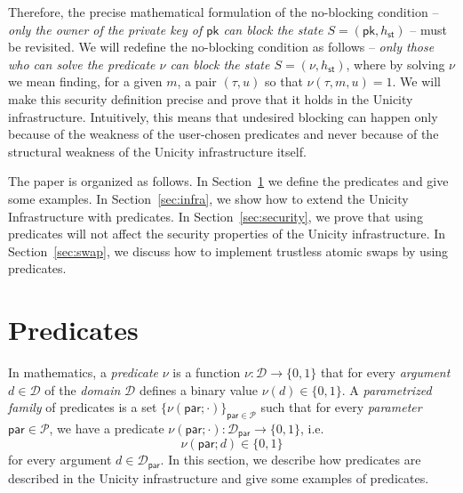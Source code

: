 \documentclass{article}
\newcommand{\pubkey}[0]{\mathsf{pk}}
\newcommand{\param}[0]{\mathsf{par}}
\newcommand{\sthash}[0]{h_\mathsf{st}}
\newcommand{\predi}[0]{\nu}
\newcommand{\systime}[0]{\tau}
\begin{document}
Therefore, the precise mathematical formulation of the no-blocking condition -- \emph{only the owner of the private key of $\pubkey$ can block the state $S=(\pubkey,\sthash)$} -- must be revisited. We will redefine the no-blocking condition as follows -- \emph{only those who can solve the predicate $\predi$ can block the state $S=(\predi,\sthash)$}, where by solving $\predi$ we mean finding, for a given $m$, a pair $(\systime,u)$ so that $\predi(\systime,m,u)=1$.
We will make this security definition precise and prove that it holds in the Unicity infrastructure. Intuitively, this means that undesired blocking can happen only because of the weakness of the user-chosen predicates and never because of the structural weakness of the Unicity infrastructure itself.

The paper is organized as follows. In Section~\ref{sec:predicates} we define the predicates and give some examples. In Section~\ref{sec:infra},
we show how to extend the Unicity Infrastructure with predicates.
In Section~\ref{sec:security}, we prove that using predicates will not affect the security properties of the Unicity infrastructure. In Section~\ref{sec:swap}, we discuss how to implement trustless atomic swaps by using predicates.



\section{Predicates}\label{sec:predicates}

In mathematics, a \emph{predicate} $\nu$ is a function
$\nu\colon \mathcal{D}\rightarrow \{0,1\}$ that for every \emph{argument} $d\in \mathcal{D}$ of the
\emph{domain} $\mathcal{D}$ defines a binary value $\nu(d)\in\{0,1\}$.
A \emph{parametrized family} of predicates is a set $\{\nu(\param;\cdot)\}_{\param\in\mathcal{P}}$ such that
for every \emph{parameter} $\param\in\mathcal{P}$, we have a predicate
$\nu(\param;\cdot)\colon \mathcal{D}_\param\rightarrow\{0,1\}$, i.e.
\[
\nu(\param;d)\in\{0,1\}
\]
for every argument $d\in\mathcal{D}_\param$.
In this section, we describe how predicates are described in the Unicity infrastructure and give some examples of predicates.
\end{document}
